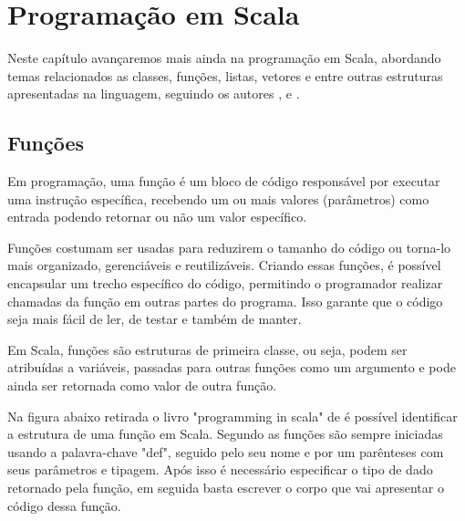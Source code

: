 

\chapter{ Programa\c{c}\~{a}o em Scala}
Neste capítulo avançaremos mais ainda na programação em Scala, abordando temas relacionados as classes, funções, listas, vetores e entre outras estruturas apresentadas na linguagem, seguindo os autores \cite{Odersky}, \cite{Sfregola2021} e \cite{Wampler2021}.

    \section{Funções}
    Em programação, uma função é um bloco de código responsável por executar uma instrução específica, recebendo um ou mais valores (parâmetros) como entrada podendo retornar ou não um valor específico.
    
    Funções costumam ser usadas para reduzirem o tamanho do código ou torna-lo mais organizado, gerenciáveis e reutilizáveis. Criando essas funções, é possível encapsular um trecho específico do código, permitindo o programador realizar chamadas da função em outras partes do programa. Isso garante que o código seja mais fácil de ler, de testar e também de manter.
    
    Em Scala, funções são estruturas de primeira classe, ou seja, podem ser atribuídas a variáveis, passadas para outras funções como um argumento e pode ainda ser retornada como valor de outra função.
    
    Na figura abaixo retirada o livro "programming in scala" de \cite{Odersky} é possível identificar a estrutura de uma função em Scala. Segundo \cite{Odersky} as funções são sempre iniciadas usando a palavra-chave "def", seguido pelo seu nome e por um parênteses com seus parâmetros e tipagem. Após isso é necessário especificar o tipo de dado retornado pela função, em seguida basta escrever o corpo que vai apresentar o código dessa função.
    
